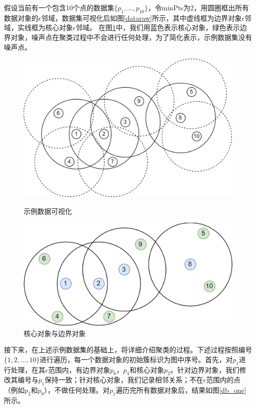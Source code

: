假设当前有一个包含10个点的数据集$ \{p_1,...,p_{10}\} $，令minPts为2，用圆圈框出所有数据对象的$ \epsilon $邻域，数据集可视化后如图\ref{dataraw}所示，其中虚线框为边界对象$ \epsilon $邻域，实线框为核心对象$ \epsilon $邻域。
在图\ref{dbraw}中，我们用蓝色表示核心对象，绿色表示边界对象，噪声点在聚类过程中不会进行任何处理，为了简化表示，示例数据集没有噪声点。
\begin{figure}[htbp]
	\begin{minipage}[t]{0.48\linewidth}
		\centering
		\includegraphics[width=\linewidth]{img/dbraw.png}
		\caption{示例数据可视化}
		\label{dataraw}
	\end{minipage}
	\hfill
	\begin{minipage}[t]{0.48\linewidth}
		\centering
		\includegraphics[width=\linewidth]{img/db1.png}
		\caption{核心对象与边界对象}
		\label{dbraw}
	\end{minipage}
\end{figure}

接下来，在上述示例数据集的基础上，将详细介绍聚类的过程。下述过程按照编号$ \{1,2,...,10\} $进行遍历，每一个数据对象的初始簇标识为图中序号。首先，对$ p_1 $进行处理，在其$ \epsilon $范围内，有边界对象$ p_6$，$p_4 $和核心对象$ p_2 $。针对边界对象，我们修改其编号与$ p_1 $保持一致；针对核心对象，我们记录相邻关系；不在$ \epsilon $范围内的点（例如$ p_3 $和$ p_9 $），不做任何处理。对$ p_1 $遍历完所有数据对象后，结果如图\ref{db_one}所示。

